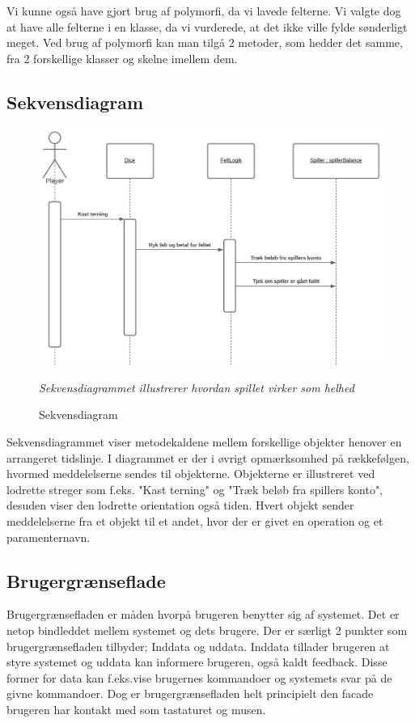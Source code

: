 Vi kunne også have gjort brug af polymorfi, da vi lavede felterne. Vi valgte dog at have alle felterne i en klasse, da vi vurderede, at det ikke ville fylde sønderligt meget. Ved brug af polymorfi kan man tilgå 2 metoder, som hedder det samme, fra 2 forskellige klasser og skelne imellem dem. 
        
\subsection{Sekvensdiagram}
    \begin{figure}[H]
        \centering
        \includegraphics[width=15cm]{figures/systemSekvensDiagram.JPG}
        \caption{Sekvensdiagram}
        \emph{Sekvensdiagrammet illustrerer hvordan spillet virker som helhed}
    \end{figure}
    
Sekvensdiagrammet viser metodekaldene mellem forskellige objekter henover en arrangeret tidslinje. I diagrammet er der i øvrigt opmærksomhed på rækkefølgen, hvormed meddelelserne sendes til objekterne. 
Objekterne er illustreret ved lodrette streger som f.eks. "Kast terning" og "Træk beløb fra spillers konto", desuden viser den lodrette orientation også tiden. Hvert objekt sender meddelelserne fra et objekt til et andet, hvor der er givet en operation og et paramenternavn.  

\newpage
\subsection{Brugergrænseflade}
Brugergrænsefladen er måden hvorpå brugeren benytter sig af systemet. Det er netop bindleddet mellem systemet og dets brugere. Der er særligt 2 punkter som brugergrænsefladen tilbyder; Inddata og uddata. Inddata tillader brugeren at styre systemet og uddata kan informere brugeren, også kaldt feedback. Disse former for data kan f.eks.vise brugernes kommandoer og systemets svar på de givne kommandoer. Dog er brugergrænsefladen helt principielt den facade brugeren har kontakt med som tastaturet og musen.


